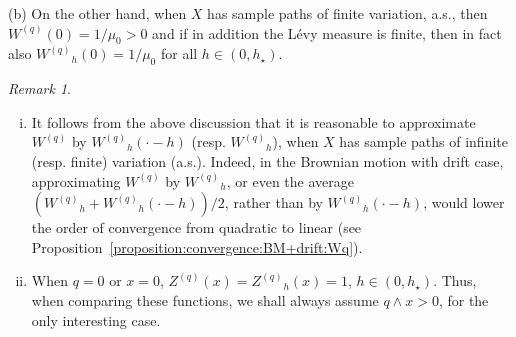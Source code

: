 \documentclass[pdftex,oneside,11pt,reqno]{amsart}
\theoremstyle{definition}
\theoremstyle{theorem}
\theoremstyle{remark}
\newtheorem{remark}{Remark}[section]
\numberwithin{equation}{section}
\numberwithin{definition}{section}
\begin{document}
\noindent (b) On the other hand, when $X$ has sample paths of finite variation, a.s., then ${W^{(q)}}(0)=1/\mu_0>0$ \cite[p. 33, Lemma 3.1]{kuznetsovkyprianourivero} and if in addition the L\'evy measure is finite, then in fact also ${W^{(q)}}_h(0)=1/\mu_0$ for all $h\in (0,h_\star)$. 

\begin{remark}\label{remark:basic}
\begin{enumerate}[(i)]
\item\label{remark:basic:i} It follows from the above discussion that it is reasonable to approximate ${W^{(q)}}$ by ${W^{(q)}}_h(\cdot-h)$ (resp. ${W^{(q)}}_h$), when $X$ has sample paths of infinite (resp. finite) variation (a.s.). Indeed, in the Brownian motion with drift case, approximating ${W^{(q)}}$ by ${W^{(q)}}_h$, or even the average $({W^{(q)}}_h+{W^{(q)}}_h(\cdot-h))/2$, rather than by ${W^{(q)}}_h(\cdot-h)$, would lower the order of convergence from quadratic to linear (see Proposition~\ref{proposition:convergence:BM+drift:Wq}).  
\item When $q=0$ or $x=0$, ${Z^{(q)}}(x)={Z^{(q)}}_h(x)=1$, $h\in (0,h_\star)$. Thus, when comparing these functions, we shall always assume $q\land x>0$, for the only interesting case.
\end{enumerate}
\end{remark}
\end{document}
